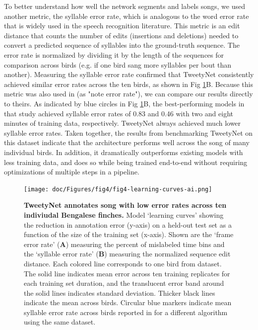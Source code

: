 \documentclass[10pt,letterpaper]{article}
\newcommand{\todotg}[1]{
\todo[bordercolor=yellow, color=yellow!40, size=\small]{#1}
}
\begin{document}
To better understand how well the network segments and labels songs, we used another metric, the syllable error rate, which is analogous to the word error rate that is widely used in the speech recognition literature. This metric is an edit distance that counts the number of edits (insertions and deletions) needed to convert a predicted sequence of syllables into the ground-truth sequence. The error rate is normalized by dividing it by the length of the sequences for comparison across birds (e.g. if one bird sang more syllables per bout than another).
Measuring the syllable error rate confirmed that TweetyNet consistently achieved similar error rates across the ten birds, as shown in 
Fig \ref{fig4}B. Because this metric was also used in \cite{koumura_automatic_2016-1} 
(as "note error rate"), we can compare our results directly to theirs. 
As indicated by blue circles in Fig \ref{fig4}B, the best-performing models in that study achieved syllable
error rates of 0.83 and 0.46 with two and eight minutes of training data, respectively. TweetyNet always
achieved much lower syllable error rates. Taken together, the results from benchmarking TweetyNet on this
dataset indicate that the architecture performs well across the song of many individual birds. In addition, it dramatically outperforms existing models with less training data, and does so while being trained end-to-end
without requiring optimizations of multiple steps in a pipeline.

\begin{figure}[!h]
\texttt{[image: doc/Figures/fig4/fig4-learning-curves-ai.png]}
\caption{{\bf TweetyNet annotates song with low error rates across ten indiviudal Bengalese finches.}
Model ‘learning curves’ showing the reduction in annotation error (y-axis) 
on a held-out test set as a function of the size of the training set (x-axis). 
Shown are the ‘frame error rate’ (\textbf{A}) measuring the percent of mislabeled time bins 
and the ‘syllable error rate’ (\textbf{B}) measuring the normalized sequence edit distance. 
Each colored line corresponds to one bird from dataset. 
The solid line indicates mean error across ten training replicates 
for each training set duration, and the translucent error band 
around the solid lines indicates standard deviation. 
Thicker black lines indicate the mean across birds. 
Circular blue markers indicate mean syllable error rate across birds 
reported in \cite{koumura_automatic_2016-1} 
for a different algorithm using the same dataset.}
\label{fig4}
\end{figure}
\end{document}
